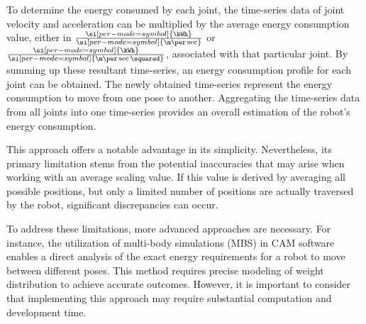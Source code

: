 To determine the energy consumed by each joint, the time-series data of joint velocity and acceleration can be multiplied by the average energy consumption value, either in \(\frac{\si[per-mode=symbol]{\kWh}}{\si[per-mode=symbol]{\m\per\sec }}\) or \(\frac{\si[per-mode=symbol]{\kWh}}{\si[per-mode=symbol]{\m\per\sec\squared }}\), associated with that particular joint. By summing up these resultant time-series, an energy consumption profile for each joint can be obtained. The newly obtained time-series represent the energy consumption to move from one pose to another. Aggregating the time-series data from all joints into one time-series provides an overall estimation of the robot's energy consumption. %

This approach offers a notable advantage in its simplicity. Nevertheless, its primary limitation stems from the potential inaccuracies that may arise when working with an average scaling value. If this value is derived by averaging all possible positions, but only a limited number of positions are actually traversed by the robot, significant discrepancies can occur.


To address these limitations, more advanced approaches are necessary. For instance, the utilization of multi-body simulations (\acrshort{MBS}) in \acrshort{CAM} software enables a direct analysis of the exact energy requirements for a robot to move between different poses. This method requires precise modeling of weight distribution to achieve accurate outcomes. However, it is important to consider that implementing this approach may require substantial computation and development time.


